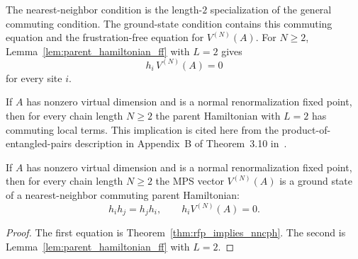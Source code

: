 \begin{remark}
    \leanok
    The nearest-neighbor condition is the length-$2$ specialization of the
    general commuting condition. The ground-state condition contains this
    commuting equation and the frustration-free equation for $V^{(N)}(A)$.
    For $N\ge 2$, Lemma~\ref{lem:parent_hamiltonian_ff} with $L=2$ gives
    \[
        h_i\,V^{(N)}(A)=0
    \]
    for every site $i$.
\end{remark}

\begin{theorem}\label{thm:rfp_implies_nncph}
    \leanok
    If $A$ has nonzero virtual dimension and is a normal renormalization fixed
    point, then for every chain length $N \ge 2$ the parent Hamiltonian with
    $L = 2$ has commuting local terms.
    This implication is cited here from the product-of-entangled-pairs
    description in Appendix~B of
    Theorem~3.10 in~\cite{Cirac2016MPDO_arXiv}.
\end{theorem}

\begin{theorem}%
    \label{thm:rfp_implies_nncph_ground_state}
    \leanok
    If $A$ has nonzero virtual dimension and is a normal renormalization fixed
    point, then for every chain length $N \ge 2$ the MPS vector $V^{(N)}(A)$ is
    a ground state of a nearest-neighbor commuting parent Hamiltonian:
    \[
        h_i h_j = h_j h_i,\qquad
        h_i V^{(N)}(A)=0.
    \]
\end{theorem}

\begin{proof}
    \leanok
    The first equation is Theorem~\ref{thm:rfp_implies_nncph}. The second is
    Lemma~\ref{lem:parent_hamiltonian_ff} with $L=2$.
\end{proof}


